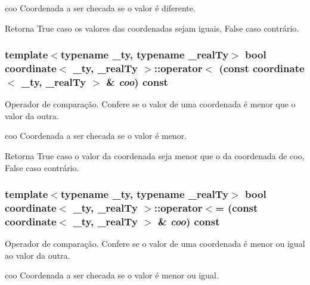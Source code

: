 coo Coordenada a ser checada se o valor é diferente.

\begin{DoxyReturn}{Retorna}
True caso os valores das coordenadas sejam iguais, False caso contrário. 
\end{DoxyReturn}
\hypertarget{classcoordinate_a052d4f0f28d416b72fe1b8ecccf80858}{
\subsubsection[{operator$<$}]{\setlength{\rightskip}{0pt plus 5cm}template$<$typename \_\-ty, typename \_\-realTy$>$ bool {\bf coordinate}$<$ \_\-ty, \_\-realTy $>$::operator$<$ (const {\bf coordinate}$<$ \_\-ty, \_\-realTy $>$ \& {\em coo}) const}}
\label{classcoordinate_a052d4f0f28d416b72fe1b8ecccf80858}
Operador de comparação. Confere se o valor de uma coordenada é menor que o valor da outra.

coo Coordenada a ser checada se o valor é menor.

\begin{DoxyReturn}{Retorna}
True caso o valor da coordenada seja menor que o da coordenada de coo, False caso contrário. 
\end{DoxyReturn}
\hypertarget{classcoordinate_a5c4a0543683ec8a6cbe751a075bd5187}{
\subsubsection[{operator$<$=}]{\setlength{\rightskip}{0pt plus 5cm}template$<$typename \_\-ty, typename \_\-realTy$>$ bool {\bf coordinate}$<$ \_\-ty, \_\-realTy $>$::operator$<$= (const {\bf coordinate}$<$ \_\-ty, \_\-realTy $>$ \& {\em coo}) const}}
\label{classcoordinate_a5c4a0543683ec8a6cbe751a075bd5187}
Operador de comparação. Confere se o valor de uma coordenada é menor ou igual ao valor da outra.

coo Coordenada a ser checada se o valor é menor ou igual.

